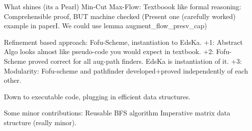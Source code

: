 \documentclass{llncs}
\begin{document}
What shines (its a Pearl)
  Min-Cut Max-Flow: Textboook like formal reasoning: Comprehensible proof, BUT machine checked
    (Present one (carefully worked) example in paperI. We could use lemma augment_flow_presv_cap)
    
  Refinement based approach: Fofu-Scheme, instantiation to EdsKa. 
    +1: Abstract Algo looks almost like pseudo-code you would expect in textbook.
    +2: Fofu-Scheme proved correct for all aug-path finders. EdsKa is instantiation of it.
    +3: Modularity: Fofu-scheme and pathfinder developed+proved independently of each other.
  
  Down to executable code, plugging in efficient data structures.
  
Some minor contributions:
  Reusable BFS algorithm
  Imperative matrix data structure (really minor).
  
  
  
    









\end{document}

